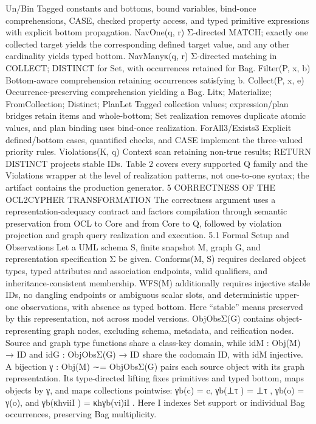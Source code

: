 Un/Bin
Tagged constants and bottoms, bound variables, bind-once comprehensions, CASE, checked
property access, and typed primitive expressions with explicit bottom propagation.
NavOne(q, r) Σ-directed MATCH; exactly one collected target yields the corresponding defined target value,
and any other cardinality yields typed bottom.
NavManyκ(q, r) Σ-directed matching in COLLECT; DISTINCT for Set, with occurrences retained for Bag.
Filter(P, x, b) Bottom-aware comprehension retaining occurrences satisfying b.
Collect(P, x, e) Occurrence-preserving comprehension yielding a Bag.
Litκ; Materialize;
FromCollection; Distinct;
PlanLet
Tagged collection values; expression/plan bridges retain items and whole-bottom; Set
realization removes duplicate atomic values, and plan binding uses bind-once realization.
ForAll3/Exists3 Explicit defined/bottom cases, quantified checks, and CASE implement the three-valued
priority rules.
Violations(K, q) Context scan retaining non-true results; RETURN DISTINCT projects stable IDs.
Table 2 covers every supported Q family and the Violations wrapper at the level of
realization patterns, not one-to-one syntax; the artifact contains the production generator.
5 CORRECTNESS OF THE OCL2CYPHER
TRANSFORMATION
The correctness argument uses a representation-adequacy contract and factors compilation through semantic preservation from OCL to Core and from Core to Q, followed by
violation projection and graph query realization and execution.
5.1 Formal Setup and Observations
Let a UML schema S, finite snapshot M, graph G, and representation specification Σ
be given. Conforms(M, S) requires declared object types, typed attributes and association endpoints, valid qualifiers, and inheritance-consistent membership. WFS(M) additionally requires injective stable IDs, no dangling endpoints or ambiguous scalar slots,
and deterministic upper-one observations, with absence as typed bottom. Here “stable”
means preserved by this representation, not across model versions.
ObjObsΣ(G) contains object-representing graph nodes, excluding schema, metadata, and reification nodes. Source and graph type functions share a class-key domain,
while idM : Obj(M) → ID and idG : ObjObsΣ(G) → ID share the codomain ID, with
idM injective. A bijection γ : Obj(M) ∼= ObjObsΣ(G) pairs each source object with its
graph representation. Its type-directed lifting fixes primitives and typed bottom, maps
objects by γ, and maps collections pointwise: γb(c) = c, γb(⊥τ ) = ⊥τ , γb(o) = γ(o),
and γb(κhviiI ) = κhγb(vi)iI . Here I indexes Set support or individual Bag occurrences,
preserving Bag multiplicity.

